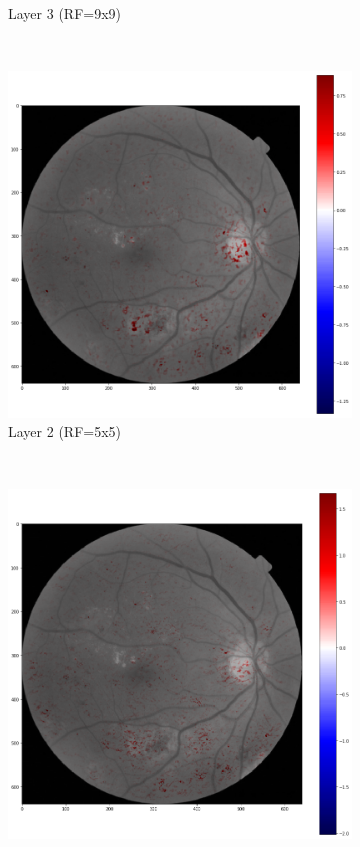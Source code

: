 \documentclass[review]{elsarticle}
\theoremstyle{definition} %
\theoremstyle{remark}
\begin{document}
\begin{figure}[!ht]
\begin{subfigure}{0.45\textwidth}
		\caption{Layer 3 (RF=9x9)}
		\label{fig:score_rf9}
	\end{subfigure}\\
	\begin{subfigure}{0.45\textwidth}
		\includegraphics[width=\textwidth]{./figures/maps/rf5c.png}
		\caption{Layer 2 (RF=5x5)}
		\label{fig:score_rf5}
	\end{subfigure}
	~ %
	\begin{subfigure}{0.45\textwidth}
		\includegraphics[width=\textwidth]{./figures/maps/rf3c.png}

\end{subfigure}
\end{figure}
\end{document}
